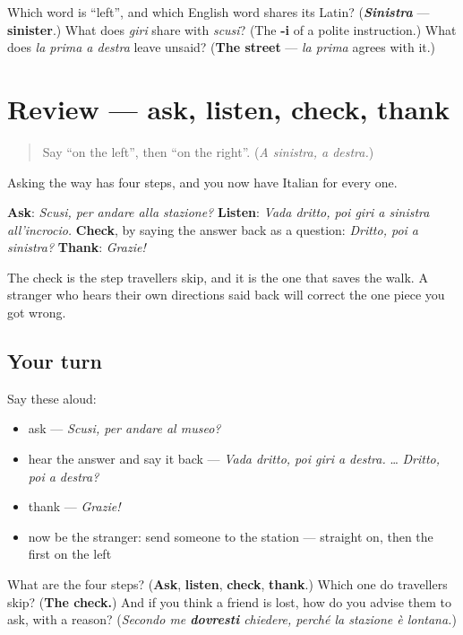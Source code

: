 \begin{tcolorbox}[breakable,colback=teal!4,colframe=teal!35!black,title={Before you move on}]
Which word is \textquotedblleft{}left\textquotedblright{}, and which English word shares its Latin? (\emph{\textbf{Sinistra}} — \textbf{sinister}.) What does \emph{giri} share with \emph{scusi}? (The \textbf{-i} of a polite instruction.) What does \emph{la prima a destra} leave unsaid? (\textbf{The street} — \emph{la prima} agrees with it.)
\end{tcolorbox}
\section[(review)]{Review — ask, listen, check, thank}

\label{lesson:IT-C267-ripasso-strada}



\begin{quote}
Say \textquotedblleft{}on the left\textquotedblright{}, then \textquotedblleft{}on the right\textquotedblright{}. (\emph{A sinistra, a destra.})
\end{quote}

\begin{grammarlens}[title={What you've built}]
Asking the way has four steps, and you now have Italian for every one.

\textbf{Ask}: \emph{Scusi, per andare alla stazione?} \textbf{Listen}: \emph{Vada dritto, poi giri a sinistra all'incrocio.} \textbf{Check}, by saying the answer back as a question: \emph{Dritto, poi a sinistra?} \textbf{Thank}: \emph{Grazie!}

The check is the step travellers skip, and it is the one that saves the walk. A stranger who hears their own directions said back will correct the one piece you got wrong.
\end{grammarlens}

\subsection*{Your turn}
Say these aloud:

\begin{itemize}
\raggedright
  \item ask — \emph{Scusi, per andare al museo?}
  \item hear the answer and say it back — \emph{Vada dritto, poi giri a destra.} … \emph{Dritto, poi a destra?}
  \item thank — \emph{Grazie!}
  \item now be the stranger: send someone to the station — straight on, then the first on the left
\end{itemize}

\begin{tcolorbox}[breakable,colback=teal!4,colframe=teal!35!black,title={Before you move on}]
What are the four steps? (\textbf{Ask}, \textbf{listen}, \textbf{check}, \textbf{thank}.) Which one do travellers skip? (\textbf{The check.}) And if you think a friend is lost, how do you advise them to ask, with a reason? (\emph{Secondo me \textbf{dovresti} chiedere, perché la stazione è lontana.})
\end{tcolorbox}
